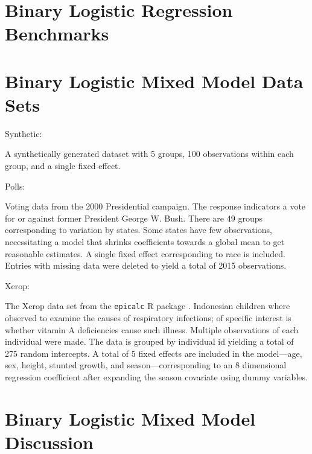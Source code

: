 \documentclass[11pt]{article}
\begin{document}
\section{Binary Logistic Regression Benchmarks}
\label{sec:blogit-benchmarks}

% 


\pagebreak

\section{Binary Logistic Mixed Model Data Sets}

\begin{outline}

\1 Synthetic:

A synthetically generated dataset with 5 groups, 100 observations within each
group, and a single fixed effect.

\1 Polls:

Voting data from the 2000 Presidential campaign.  The response indicators a vote
for or against former President George W. Bush.  There are 49 groups
corresponding to variation by states.  Some states have few observations,
necessitating a model that shrinks coefficients towards a global mean to get
reasonable estimates.  A single fixed effect corresponding to race is included.
Entries with missing data were deleted to yield a total of 2015 observations.

\1 Xerop:

The Xerop data set from the \texttt{epicalc} R package \citep{epicalc-2012}.
Indonesian children where observed to examine the causes of respiratory
infections; of specific interest is whether vitamin A deficiencies cause such
illness.  Multiple observations of each individual were made.  The data is
grouped by individual id yielding a total of 275 random intercepts.  A total of
5 fixed effects are included in the model---age, sex, height, stunted growth,
and season---corresponding to an 8 dimensional regression coefficient after
expanding the season covariate using dummy variables.

\end{outline}

\section{Binary Logistic Mixed Model Discussion}
\label{sec:logitmm-discussion}
\end{document}
